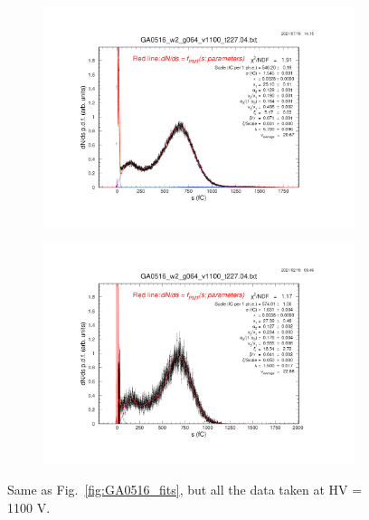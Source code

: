 \begin{figure}[b]
\begin{subfigure}[c]{0.42\linewidth}
		\includegraphics[width=\linewidth, trim={6cm 6cm 75mm 85mm},clip]{figures/GA0516_w2_g064_v1100_6mm.04.png}
		\vspace{0mm}
	\end{subfigure}%
	\begin{subfigure}[c]{0.42\linewidth}
		\centering
		\includegraphics[width=\linewidth, trim={75mm 6cm 6cm 85mm},clip]{figures/GA0516_w3_g064_v1100_raw.04.png}
		\vspace{0mm}
	\end{subfigure}%
	\caption{Same as Fig.~\ref{fig:GA0516_fits}, but all the data taken at HV = 1100 V.}
	\label{fig:GA0516_hv1100_fits}
\end{figure}

